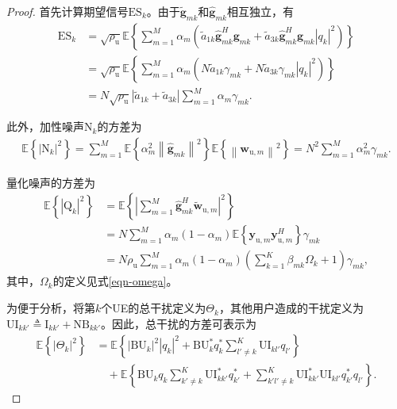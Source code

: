 \begin{proof}
首先计算期望信号$\text{ES}_k$。由于$\tilde{\mathbf{g}}_{mk}$和$\hat{\mathbf{g}}_{mk}$相互独立，有
\begin{align}
{\text{ES}_k} &= { {\sqrt {{\rho _\text{u}}} \mathbb{E} \left\{ {\sum_{m = 1}^M {\alpha _m}({\tilde{a}_{1k}}{\mathbf{\hat g}}_{mk}^H{{\mathbf{g}}_{mk}} + {\tilde{a}_{3k}}{\mathbf{\hat g}}_{mk}^H{{\mathbf{g}}_{mk}}{{\left| {{q_k}} \right|}^2})} \right\} }}\nonumber\\
 &= \sqrt {{\rho _\text{u}}} {{\mathbb{E} \left\{ {\sum_{m = 1}^M {\alpha _m}(N{\tilde{a}_{1k}}{\gamma _{mk}} + N{\tilde{a}_{3k}}{\gamma _{mk}}{{\left| {{q_k}} \right|}^2})} \right\}}}\nonumber\\
 &= {N}\sqrt{\rho _\text{u}}{\left| {{\tilde{a}_{1k}} + {\tilde{a}_{3k}}} \right|}{\sum_{m = 1}^M {\alpha _m}{\gamma _{mk}}}.
\end{align}

此外，加性噪声$\text{N}_k$的方差为
\begin{align}\label{eqn-46}
\mathbb{E}\left\{\left|\text{N}_{k}\right|^{2}\right\}=\sum_{m=1}^{M} \mathbb{E}\left\{\alpha_{m}^{2}\left\|\hat{\mathbf{g}}_{m k}\right\|^{2}\right\} \mathbb{E}\left\{\left\|\mathbf{w}_{\text{u}, m}\right\|^{2}\right\} \nonumber
=N^{2} \sum_{m=1}^{M} \alpha_{m}^{2} \gamma_{m k}.
\end{align}

量化噪声的方差为
\begin{align}
\mathbb{E}\left\{ {{{\left| {{\text{Q}_k}} \right|}^2}} \right\} &= \mathbb{E}\left\{ {\left| {\mathop \sum \limits_{m = 1}^M {\mathbf{\hat g}}_{mk}^H{\tilde{\mathbf w}}_{\text{u},m}} \right|^2} \right\}\nonumber\\
 &= N\sum_{m=1}^{M}\alpha_m (1-\alpha_m )\mathbb{E} \left \{ \mathbf{y}_{\text{u},m} \mathbf{y}_{\text{u},m}^H \right \} \gamma _{mk}\nonumber \\
 &= {N}{\rho _\text{u}}\mathop \sum \limits_{m = 1}^M {\alpha _m}(1 - {\alpha _m})\left( {\mathop \sum \limits_{k = 1}^K {\beta _{mk}}\Omega _k + 1} \right){\gamma _{mk}},
\end{align}
其中，$\Omega_k$的定义见式\eqref{eqn-omega}。

为便于分析，将第$k$个UE的总干扰定义为$\Theta_k$，其他用户造成的干扰定义为$\text{UI}_{kk'} \triangleq \text{I}_{kk'} + \text{NB}_{kk'}$。因此，总干扰的方差可表示为
\begin{align}\label{eqn-47}\mathbb{E } \left\{ {{{\left| \Theta_k  \right|}^2}} \right\} &= \mathbb{E } \left\{ {{{\left| {\text{BU}_k} \right|}^2}{{\left| {{q_k}} \right|}^2} + \text{BU}_k^ * q_k^ * \sum _{l' \ne k}^K \text{UI}_{kl'}{q_{l'}}} \right\} \nonumber\\
&\quad+ \mathbb{E } \left\{ {\text{BU}_k{q_k}\sum_{k' \ne k}^K \text{UI}_{kk'}^ * q_{k'}^ *  + \sum_{k'l' \ne k}^K \text{UI}_{kk'}^ * \text{UI}_{kl'}q_{k'}^ * {q_{l'}}} \right\}.\end{align}


\end{proof}
